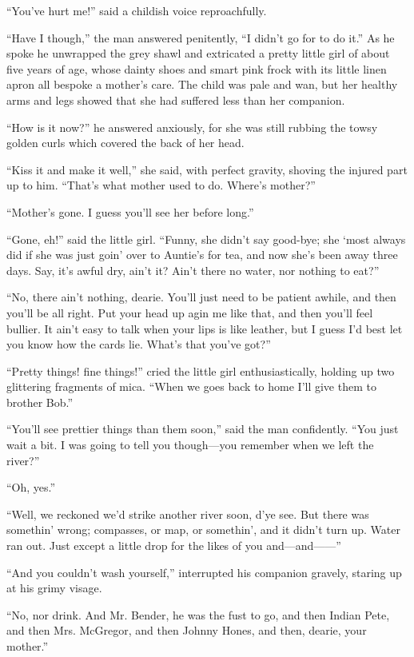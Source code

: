 \documentclass[12pt]{book}
\begin{document}
“You’ve hurt me!” said a childish voice reproachfully. 

“Have I though,” the man answered penitently, “I didn’t go for to do it.” As he spoke he unwrapped the grey shawl and extricated a pretty little girl of about five years of age, whose dainty shoes and smart pink frock with its little linen apron all bespoke a mother’s care. The child was pale and wan, but her healthy arms and legs showed that she had suffered less than her companion. 

“How is it now?” he answered anxiously, for she was still rubbing the towsy golden curls which covered the back of her head. 

“Kiss it and make it well,” she said, with perfect gravity, shoving the injured part up to him. “That’s what mother used to do. Where’s mother?” 

“Mother’s gone. I guess you’ll see her before long.” 

“Gone, eh!” said the little girl. “Funny, she didn’t say good-bye; she ‘most always did if she was just goin’ over to Auntie’s for tea, and now she’s been away three days. Say, it’s awful dry, ain’t it? Ain’t there no water, nor nothing to eat?” 

“No, there ain’t nothing, dearie. You’ll just need to be patient awhile, and then you’ll be all right. Put your head up agin me like that, and then you’ll feel bullier. It ain’t easy to talk when your lips is like leather, but I guess I’d best let you know how the cards lie. What’s that you’ve got?” 

“Pretty things! fine things!” cried the little girl enthusiastically, holding up two glittering fragments of mica. “When we goes back to home I’ll give them to brother Bob.” 

“You’ll see prettier things than them soon,” said the man confidently. “You just wait a bit. I was going to tell you though—you remember when we left the river?” 

“Oh, yes.” 

“Well, we reckoned we’d strike another river soon, d’ye see. But there was somethin’ wrong; compasses, or map, or somethin’, and it didn’t turn up. Water ran out. Just except a little drop for the likes of you and—and——” 

“And you couldn’t wash yourself,” interrupted his companion gravely, staring up at his grimy visage. 

“No, nor drink. And Mr. Bender, he was the fust to go, and then Indian Pete, and then Mrs. McGregor, and then Johnny Hones, and then, dearie, your mother.” 
\end{document}
